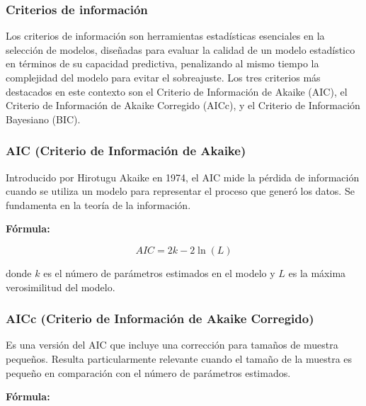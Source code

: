 \documentclass[
  11pt,
  bookmarksnumbered]{article}
\begin{document}
\hypertarget{criterios-de-informaciuxf3n}{%
\subsubsection{Criterios de información}\label{criterios-de-informaciuxf3n}}

Los criterios de información son herramientas estadísticas esenciales en la selección de modelos, diseñadas para evaluar la calidad de un modelo estadístico en términos de su capacidad predictiva, penalizando al mismo tiempo la complejidad del modelo para evitar el sobreajuste.
Los tres criterios más destacados en este contexto son el Criterio de Información de Akaike (AIC), el Criterio de Información de Akaike Corregido (AICc), y el Criterio de Información Bayesiano (BIC).

\hypertarget{aic-criterio-de-informaciuxf3n-de-akaike}{%
\subsubsection{AIC (Criterio de Información de Akaike)}\label{aic-criterio-de-informaciuxf3n-de-akaike}}

Introducido por Hirotugu Akaike en 1974, el AIC mide la pérdida de información cuando se utiliza un modelo para representar el proceso que generó los datos.
Se fundamenta en la teoría de la información.

\textbf{Fórmula:}


\begin{equation} AIC = 2k - 2\ln(L) \end{equation}

donde \(k\) es el número de parámetros estimados en el modelo y \(L\) es la máxima verosimilitud del modelo.

\hypertarget{aicc-criterio-de-informaciuxf3n-de-akaike-corregido}{%
\subsubsection{AICc (Criterio de Información de Akaike Corregido)}\label{aicc-criterio-de-informaciuxf3n-de-akaike-corregido}}

Es una versión del AIC que incluye una corrección para tamaños de muestra pequeños.
Resulta particularmente relevante cuando el tamaño de la muestra es pequeño en comparación con el número de parámetros estimados.

\textbf{Fórmula:}
\end{document}
